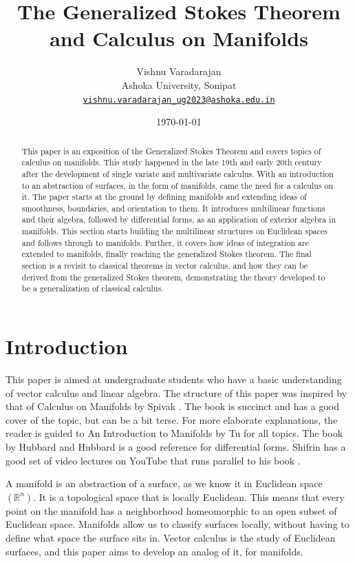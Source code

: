 \documentclass{article}
\title{\textbf{The Generalized Stokes Theorem and Calculus on Manifolds}}
\author{Vishnu Varadarajan
\\
Ashoka University, Sonipat\\
\href{mailto:vishnu.varadarajan\_ug2023@ashoka.edu.in}{\tt vishnu.varadarajan\_ug2023@ashoka.edu.in}}
\date{\today}
\theoremstyle{definition}
\theoremstyle{named}
\begin{document}
\maketitle

\begin{abstract}
This paper is an exposition of the Generalized Stokes Theorem and covers topics of calculus on manifolds. This study happened in the late 19th and early 20th century after the development of single variate and multivariate calculus. With an introduction to an abstraction of surfaces, in the form of manifolds, came the need for a calculus on it. The paper starts at the ground by defining manifolds and extending ideas of smoothness, boundaries, and orientation to them. It introduces multilinear functions and their algebra, followed by differential forms, as an application of exterior algebra in manifolds. This section starts building the multilinear structures on Euclidean spaces and follows through to manifolds. Further, it covers how ideas of integration are extended to manifolds, finally reaching the generalized Stokes theorem. The final section is a revisit to classical theorems in vector calculus, and how they can be derived from the generalized Stokes theorem, demonstrating the theory developed to be a generalization of classical calculus.
\end{abstract}


\section{Introduction}
This paper is aimed at undergraduate students who have a basic understanding of vector calculus and linear algebra. The structure of this paper was inspired by that of Calculus on Manifolds by Spivak \cite{spivak1971calculus}. The book is succinct and has a good cover of the topic, but can be a bit terse. For more elaborate explanations, the reader is guided to An Introduction to Manifolds by Tu \cite{tu2010introduction} for all topics. The book by Hubbard and Hubbard \cite{hubbard2009vector} is a good reference for differential forms. Shifrin has a good set of video lectures on YouTube \cite{formsplaylist} that runs parallel to his book \cite{shifrin2004multivariable}.

A manifold is an abstraction of a surface, as we know it in Euclidean space $(\mathbb{R}^n)$. It is a topological space that is locally Euclidean. This means that every point on the manifold has a neighborhood homeomorphic to an open subset of Euclidean space. Manifolds allow us to classify surfaces locally, without having to define what space the surface sits in. Vector calculus is the study of Euclidean surfaces, and this paper aims to develop an analog of it, for manifolds.
\end{document}

